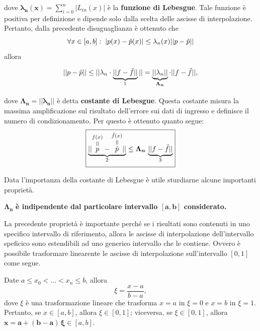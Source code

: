 \noindent dove $\boldsymbol{\lambda_n(x)}= \sum_{i=0}^n|L_{in}(x)|$ è la \textbf{funzione di Lebesgue}. Tale funzione è positiva per definizione e dipende solo dalla scelta delle ascisse di interpolazione. Pertanto, dalla precedente disuguaglianza è ottenuto che
\begin{equation*}
    \forall x\in [a,b]:\; |p(x)-\Tilde{p}(x)|\leq\lambda_n(x)||p-\Tilde{p}||
\end{equation*}
allora

\begin{equation*}
	||p-\Tilde{p}||\leq ||\lambda_n\cdot\underbrace{||f-\Tilde{f}||}_{\footnotemark}||=\underbrace{||\lambda_n||}_{\boldsymbol{\Lambda_n}}\cdot||f-\Tilde{f}||,
\end{equation*}

\noindent dove $\boldsymbol{\Lambda_n=||\lambda_n||}$ è detta \textbf{costante di Lebesgue}. Questa costante misura la massima amplificazione sul risultato dell'errore sui dati di ingresso e definisce il numero di condizionamento. Per questo è ottenuto quanto segue:
\begin{equation}\label{eq:maggPertDiffPTildeP}
    \boxed{\underbrace{||\equaltoup{p}{f(x)}-\equaltoup{\Tilde{p}}{\Tilde{f}(x)}||}_{\footnotemark}\leq\boldsymbol{\Lambda_n}\,\underbrace{||f-\Tilde{f}||}_{\footnotemark}}
\end{equation}

\addtocounter{footnote}{-1}


Data l'importanza della costante di Lebesgue è utile sturdiarne alcune importanti proprietà.

\begin{property}[di $\Lambda_n$]
	$\boldsymbol{\Lambda_n}$ \textbf{è indipendente dal particolare intervallo $\boldsymbol{[a,b]}$ considerato.}
\end{property}

La precedente proprietà è importante perché se i risultati sono contenuti in uno specifico intervallo di riferimento, allora le ascisse di interpolazione dell'intervallo speficico sono estendibili ad uno generico intervallo che le contiene. Ovvero è possibile trasformare linearente le ascisse di interpolazione sull'intervallo $[0,1]$ come segue.

Date $a\leq x_0<\hdots<x_n \leq b$, allora
\begin{equation}\label{eq:xi}
    \xi=\frac{x-a}{b-a}, 
\end{equation}
dove $\xi$ è una trasformazione lineare che trasforma $x=a$ in $\xi = 0$ e  $x=b$ in $\xi = 1$. Pertanto, se $x\in [a,b]$, allora $\xi\in [0,1]$; viceversa, se $\xi\in [0,1]$, allora $\boldsymbol{x=a+(b-a)\,\xi}\in [a,b]$.

